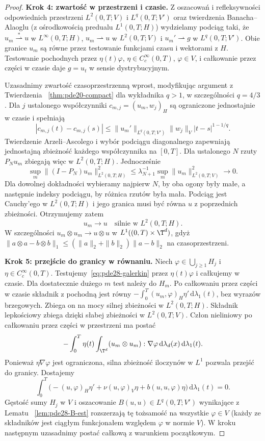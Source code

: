 \begin{proof}
\textbf{Krok 4: zwartość w przestrzeni i czasie.}
Z oszacowań i refleksywności odpowiednich
przestrzeni $L^2(0,T;V)$ i $L^q(0,T;V')$
oraz twierdzenia Banacha--Alaoglu (z ośrodkowością
predualu $L^1(0,T;H)$) wydzielamy podciąg taki, że
$u_m\stackrel{*}{\rightharpoonup}u$ w $L^\infty(0,T;H)$,
$u_m\rightharpoonup u$ w $L^2(0,T;V)$ i
$u_m'\rightharpoonup g$ w $L^q(0,T;V')$.
Obie granice $u_m$ są równe przez testowanie
funkcjami czasu i wektorami z $H$.
Testowanie pochodnych przez $\eta(t)\varphi$,
$\eta\in C_c^\infty(0,T)$, $\varphi\in V$,
i całkowanie przez części w czasie daje $g=u_t$
w sensie dystrybucyjnym.

Uzasadnimy zwartość czasoprzestrzenną wprost,
modyfikując argument z Twierdzenia
~\ref{thm:pde20-compact} dla wykładnika $q>1$,
w szczególności $q=4/3$.
Dla $j$ ustalonego współczynniki
$c_{m,j}=(u_m,w_j)_H$ są ograniczone jednostajnie
w czasie i spełniają
\[
 |c_{m,j}(t)-c_{m,j}(s)|
 \le \|u_m'\|_{L^q(0,T;V')}\|w_j\|_V
 |t-s|^{1-1/q}.
\]
Twierdzenie Arzeli--Ascolego i wybór podciągu
diagonalnego zapewniają jednostajną zbieżność
każdego współczynnika na $[0,T]$.
Dla ustalonego $N$ rzuty $P_Nu_m$ zbiegają więc
w $L^2(0,T;H)$. Jednocześnie
\[
 \sup_m\|(I-P_N)u_m\|_{L^2(0,T;H)}^2
 \le\lambda_{N+1}^{-1}
 \sup_m\|u_m\|_{L^2(0,T;V)}^2\longrightarrow0.
\]
Dla dowolnej dokładności wybieramy najpierw $N$,
by oba ogony były małe, a następnie indeksy
podciągu, by różnica rzutów była mała.
Podciąg jest Cauchy'ego w $L^2(0,T;H)$ i jego
granica musi być równa $u$ z poprzednich zbieżności.
Otrzymujemy zatem
\begin{equation}\label{eq:pde28-strong}
 u_m\longrightarrow u\quad\text{silnie w }L^2(0,T;H).
\end{equation}
W szczególności $u_m\otimes u_m\to u\otimes u$ w
$L^1((0,T)\times\T^d)$, gdyż
$\|a\otimes a-b\otimes b\|_1
\le(\|a\|_2+\|b\|_2)\|a-b\|_2$ na czasoprzestrzeni.

\textbf{Krok 5: przejście do granicy w równaniu.}
Niech $\varphi\in\bigcup_{j\ge1}H_j$ i
$\eta\in C_c^\infty(0,T)$. Testujemy~\eqref{eq:pde28-galerkin}
przez $\eta(t)\varphi$ i całkujemy w czasie.
Dla dostatecznie dużego $m$ test należy do $H_m$.
Po całkowaniu przez części w czasie składnik
z pochodną jest równy
$-\int_0^T(u_m,\varphi)_H\eta'\,\mathrm d\lambda_1(t)$,
bez wyrazów brzegowych. Zbiega on na mocy
silnej zbieżności w $L^2(0,T;H)$.
Składnik lepkościowy zbiega dzięki słabej
zbieżności w $L^2(0,T;V)$.
Człon nieliniowy po całkowaniu przez części
w przestrzeni ma postać
\[
 -\int_0^T\eta(t)\int_{\T^d}
 (u_m\otimes u_m):\nabla\varphi\,\mathrm d\lambda_d(x)
 \,\mathrm d\lambda_1(t).
\]
Ponieważ $\eta\nabla\varphi$ jest ograniczona,
silna zbieżność iloczynów w $L^1$ pozwala przejść
do granicy. Dostajemy
\[
 \int_0^T\bigl(- (u,\varphi)_H\eta'
  +\nu(u,\varphi)_V\eta+b(u,u,\varphi)\eta\bigr)
 \,\mathrm d\lambda_1(t)=0.
\]
Gęstość sumy $H_j$ w $V$ i oszacowanie
$B(u,u)\in L^q(0,T;V')$ wynikające z Lematu
~\ref{lem:pde28-B-est} rozszerzają tę tożsamość
na wszystkie $\varphi\in V$ (każdy ze składników
jest ciągłym funkcjonałem względem $\varphi$
w normie $V$). W kroku następnym uzasadnimy
postać całkową z warunkiem początkowym.


\end{proof}
